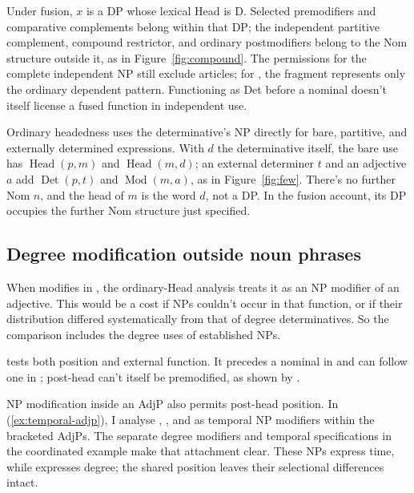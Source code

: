 \documentclass[12pt]{article}
\begin{document}
Under fusion, $x$ is a DP whose lexical Head is D. Selected premodifiers and comparative complements belong within that DP; the independent partitive complement, compound restrictor, and ordinary postmodifiers belong to the Nom structure outside it, as in Figure~\ref{fig:compound}. The permissions for the complete independent NP still exclude articles; for , the fragment represents only the ordinary dependent pattern. Functioning as Det before a nominal doesn't itself license a fused function in independent use.

Ordinary headedness uses the determinative's NP directly for bare, partitive, and externally determined expressions. With $d$ the determinative itself, the bare use has $\operatorname{Head}(p,m)$ and $\operatorname{Head}(m,d)$; an external determiner $t$ and an adjective $a$ add $\operatorname{Det}(p,t)$ and $\operatorname{Mod}(m,a)$, as in Figure~\ref{fig:few}. There's no further Nom $n$, and the head of $m$ is the word $d$, not a DP. In the fusion account, its DP occupies the further Nom structure just specified.

\subsection{Degree modification outside noun phrases}\label{sec:enough}

When  modifies  in , the ordinary-Head analysis treats it as an NP modifier of an adjective. This would be a cost if NPs couldn't occur in that function, or if their distribution differed systematically from that of degree determinatives. So the comparison includes the degree uses of established NPs.

 tests both position and external function. It precedes a nominal in  and can follow one in ; post-head  can't itself be premodified, as shown by  \citep[396--397, 445]{huddleston2002}.

NP modification inside an AdjP also permits post-head position. In (\ref{ex:temporal-adjp}), I analyse , , and  as temporal NP modifiers within the bracketed AdjPs. The separate degree modifiers and temporal specifications in the coordinated example make that attachment clear. These NPs express time, while  expresses degree; the shared position leaves their selectional differences intact.
\end{document}
